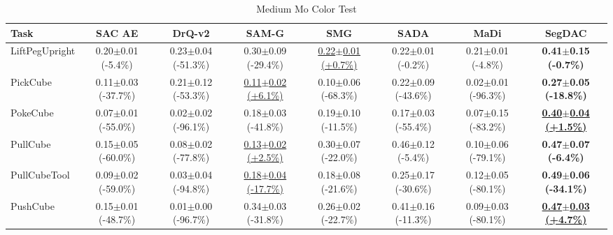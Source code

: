 \begin{table}[htbp]
\centering
\scriptsize
\caption{Medium Mo Color Test}
\label{tab:appendix_mocolortest_medium}
\begin{adjustbox}{max width=\textwidth}
\begin{tabular}{l*{7}{c}}
\toprule
\textbf{Task} & \textbf{SAC AE} & \textbf{DrQ-v2} & \textbf{SAM-G} & \textbf{SMG} & \textbf{SADA} & \textbf{MaDi} & \textbf{SegDAC} \\
\midrule
LiftPegUpright & 0.20$\pm$0.01 \scriptsize{(-5.4\%)} & 0.23$\pm$0.04 \scriptsize{(-51.3\%)} & 0.30$\pm$0.09 \scriptsize{(-29.4\%)} & \underline{0.22$\pm$0.01 \scriptsize{(+0.7\%)}} & 0.22$\pm$0.01 \scriptsize{(-0.2\%)} & 0.21$\pm$0.01 \scriptsize{(-4.8\%)} & \textbf{0.41$\pm$0.15 \scriptsize{(-0.7\%)}} \\
PickCube & 0.11$\pm$0.03 \scriptsize{(-37.7\%)} & 0.21$\pm$0.12 \scriptsize{(-53.3\%)} & \underline{0.11$\pm$0.02 \scriptsize{(+6.1\%)}} & 0.10$\pm$0.06 \scriptsize{(-68.3\%)} & 0.22$\pm$0.09 \scriptsize{(-43.6\%)} & 0.02$\pm$0.01 \scriptsize{(-96.3\%)} & \textbf{0.27$\pm$0.05 \scriptsize{(-18.8\%)}} \\
PokeCube & 0.07$\pm$0.01 \scriptsize{(-55.0\%)} & 0.02$\pm$0.02 \scriptsize{(-96.1\%)} & 0.18$\pm$0.03 \scriptsize{(-41.8\%)} & 0.19$\pm$0.10 \scriptsize{(-11.5\%)} & 0.17$\pm$0.03 \scriptsize{(-55.4\%)} & 0.07$\pm$0.15 \scriptsize{(-83.2\%)} & \textbf{\underline{0.40$\pm$0.04 \scriptsize{(+1.5\%)}}} \\
PullCube & 0.15$\pm$0.05 \scriptsize{(-60.0\%)} & 0.08$\pm$0.02 \scriptsize{(-77.8\%)} & \underline{0.13$\pm$0.02 \scriptsize{(+2.5\%)}} & 0.30$\pm$0.07 \scriptsize{(-22.0\%)} & 0.46$\pm$0.12 \scriptsize{(-5.4\%)} & 0.10$\pm$0.06 \scriptsize{(-79.1\%)} & \textbf{0.47$\pm$0.07 \scriptsize{(-6.4\%)}} \\
PullCubeTool & 0.09$\pm$0.02 \scriptsize{(-59.0\%)} & 0.03$\pm$0.04 \scriptsize{(-94.8\%)} & \underline{0.18$\pm$0.04 \scriptsize{(-17.7\%)}} & 0.18$\pm$0.08 \scriptsize{(-21.6\%)} & 0.25$\pm$0.17 \scriptsize{(-30.6\%)} & 0.12$\pm$0.05 \scriptsize{(-80.1\%)} & \textbf{0.49$\pm$0.06 \scriptsize{(-34.1\%)}} \\
PushCube & 0.15$\pm$0.01 \scriptsize{(-48.7\%)} & 0.01$\pm$0.00 \scriptsize{(-96.7\%)} & 0.34$\pm$0.03 \scriptsize{(-31.8\%)} & 0.26$\pm$0.02 \scriptsize{(-22.7\%)} & 0.41$\pm$0.16 \scriptsize{(-11.3\%)} & 0.09$\pm$0.03 \scriptsize{(-80.1\%)} & \textbf{\underline{0.47$\pm$0.03 \scriptsize{(+4.7\%)}}} \\

\end{tabular}
\end{adjustbox}
\end{table}
